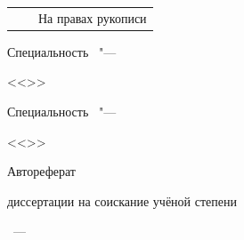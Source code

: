 \thispagestyle{empty}
\begin{center}
\end{center}
\noindent%
\begin{tabularx}{\textwidth}{@{}lXr@{}}%
   & & \large{На правах рукописи}\\
\end{tabularx}

\vspace{0pt plus1fill} %
\begin{center}
\textbf {\large \thesisAuthor}
\end{center}

\vspace{0pt plus3fill} %
\begin{center}
\textbf {\Large %
\thesisTitle}

\vspace{0pt plus3fill} %
{\large Специальность \thesisSpecialtyNumber\ "---\par <<\thesisSpecialtyTitle>>}

\ifdefined\thesisSpecialtyTwoNumber
{\large Специальность \thesisSpecialtyTwoNumber\ "---\par <<\thesisSpecialtyTwoTitle>>}
\fi

\vspace{0pt plus1.5fill} %
\Large{Автореферат}\par
\large{диссертации на соискание учёной степени\par \thesisDegree}
\end{center}

\vspace{0pt plus4fill} %
{\centering\thesisCity~--- \thesisYear\par}

